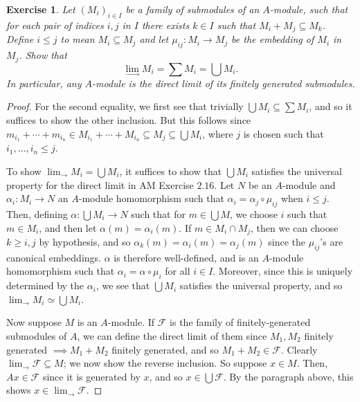 \documentclass[12pt,letterpaper]{article}
\newtheorem{problem}{Exercise}[section]
\theoremstyle{definition}
\theoremstyle{remark}
\numberwithin{figure}{problem}
\numberwithin{equation}{section}
\begin{document}
\begin{problem}
  Let $(M_i)_{i \in I}$ be a family of submodules of an $A$-module, such that for each pair of indices $i,j$ in $I$ there exists $k \in I$ such that $M_i + M_j \subseteq M_k$. Define $i \le j$ to mean $M_i \subseteq M_j$ and let $\mu_{ij} \colon M_i \to M_j$ be the embedding of $M_i$ in $M_j$. Show that
  \begin{equation*}
    \lim_{\longrightarrow} M_i = \sum M_i = \bigcup M_i.
  \end{equation*}
  In particular, any $A$-module is the direct limit of its finitely generated submodules.
\end{problem}
\begin{proof}
  For the second equality, we first see that trivially $\bigcup M_i \subseteq \sum M_i$, and so it suffices to show the other inclusion. But this follows since $m_{i_1} + \cdots + m_{i_n} \in M_{i_1} + \cdots + M_{i_n} \subseteq M_j \subseteq \bigcup M_i$, where $j$ is chosen such that $i_1,\ldots,i_n \le j$.
  \par To show $\displaystyle\lim_{\longrightarrow} M_i = \bigcup M_i$, it suffices to show that $\bigcup M_i$ satisfies the universal property for the direct limit in AM Exercise $2.16$. Let $N$ be an $A$-module and $\alpha_i : M_i \to N$ an $A$-module homomorphism such that $\alpha_i = \alpha_j \circ \mu_{ij}$ when $i \le j$. Then, defining $\alpha : \bigcup M_i \to N$ such that for $m \in \bigcup M$, we choose $i$ such that $m \in M_i$, and then let $\alpha(m) = \alpha_i(m)$. If $m \in M_i \cap M_j$, then we can choose $k \geqslant i,j$ by hypothesis, and so $\alpha_k(m) = \alpha_i(m) = \alpha_j(m)$ since the $\mu_{ij}$'s are canonical embeddings. $\alpha$ is therefore well-defined, and is an $A$-module homomorphism such that $\alpha_i = \alpha \circ \mu_i$ for all $i \in I$. Moreover, since this is uniquely determined by the $\alpha_i$, we see that $\bigcup M_i$ satisfies the universal property, and so $\displaystyle\lim_{\longrightarrow} M_i \simeq \bigcup M_i$.
  \par Now suppose $M$ is an $A$-module. If $\mathcal{F}$ is the family of finitely-generated submodules of $A$, we can define the direct limit of them since $M_1,M_2$ finitely generated $\implies M_1 + M_2$ finitely generated, and so $M_1 + M_2 \in \mathcal{F}$. Clearly $\displaystyle\lim_{\longrightarrow} \mathcal{F} \subseteq M$; we now show the reverse inclusion. So suppose $x \in M$. Then, $Ax \in \mathcal{F}$ since it is generated by $x$, and so $x \in \bigcup \mathcal{F}$. By the paragraph above, this shows $x \in \displaystyle\lim_{\longrightarrow} \mathcal{F}$.
\end{proof}
\end{document}
